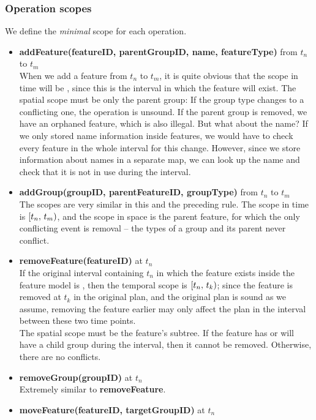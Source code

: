 \subsubsection*{Operation scopes}
We define the \textit{minimal} scope for each operation.
\begin{itemize}

  \item \textbf{addFeature(featureID, parentGroupID, name, featureType)} from $t_n$ to $t_m$\\
    When we add a feature from $t_n$ to $t_m$, it is quite obvious that the scope in time will be , since this is the interval in which the feature will exist. The spatial scope must be only the parent group: If the group type changes to a conflicting one, the operation is unsound. If the parent group is removed, we have an orphaned feature, which is also illegal. But what about the name? If we only stored name information inside features, we would have to check every feature in the whole interval for this change. However, since we store information about names in a separate map, we can look up the name and check that it is not in use during the interval.
  \item \textbf{addGroup(groupID, parentFeatureID, groupType)} from $t_n$ to $t_m$\\
    The scopes are very similar in this and the preceding rule. The scope in time is $[t_n,\, t_m)$, and the scope in space is the parent feature, for which the only conflicting event is removal -- the types of a group and its parent never conflict.
  \item \textbf{removeFeature(featureID)} at $t_n$\\
    If the original interval containing $t_n$ in which the feature exists inside the feature model is , then the temporal scope is $[t_n,\, t_k)$; since the feature is removed at $t_k$ in the original plan, and the original plan is sound as we assume, removing the feature earlier may only affect the plan in the interval between these two time points.\\
    The spatial scope must be the feature's subtree. If the feature has or will have a child group during the interval, then it cannot be removed. Otherwise, there are no conflicts.
  \item \textbf{removeGroup(groupID)} at $t_n$\\
    Extremely similar to \textbf{removeFeature}. 
  \item \textbf{moveFeature(featureID, targetGroupID)} at $t_n$\\

\end{itemize}
